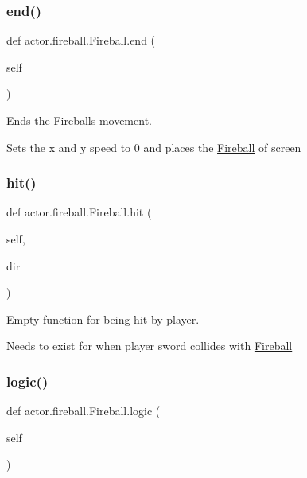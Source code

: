 \subsubsection{\texorpdfstring{end()}{end()}}
{\footnotesize\ttfamily def actor.\+fireball.\+Fireball.\+end (\begin{DoxyParamCaption}\item[{}]{self }\end{DoxyParamCaption})}



Ends the \hyperlink{classactor_1_1fireball_1_1_fireball}{Fireball}\textquotesingle{}s movement. 

Sets the x and y speed to 0 and places the \hyperlink{classactor_1_1fireball_1_1_fireball}{Fireball} of screen \mbox{\label{classactor_1_1fireball_1_1_fireball_a21e2ae2502f54f7a247f9201c167bc5e}} 
\subsubsection{\texorpdfstring{hit()}{hit()}}
{\footnotesize\ttfamily def actor.\+fireball.\+Fireball.\+hit (\begin{DoxyParamCaption}\item[{}]{self,  }\item[{}]{dir }\end{DoxyParamCaption})}



Empty function for being hit by player. 

Needs to exist for when player sword collides with \hyperlink{classactor_1_1fireball_1_1_fireball}{Fireball} \mbox{\label{classactor_1_1fireball_1_1_fireball_ad19f7a375bf095055aadce16138d5713}} 
\subsubsection{\texorpdfstring{logic()}{logic()}}
{\footnotesize\ttfamily def actor.\+fireball.\+Fireball.\+logic (\begin{DoxyParamCaption}\item[{}]{self }\end{DoxyParamCaption})}



